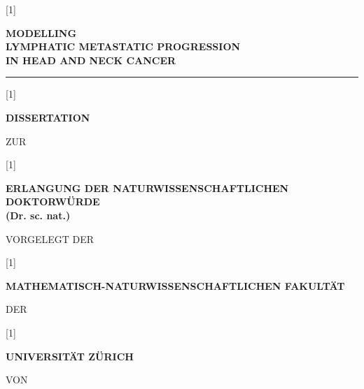 \documentclass[\relativeRoot/main.tex]{subfiles}
\begin{document}
    \begin{titlepage}
        \begin{center}
            \scalebox{0.7}[1]{\begin{minipage}{1.4\textwidth}
                \centering
                \bfseries
                \huge
                \MakeUppercase{Modelling\\Lymphatic Metastatic Progression\\in Head and Neck Cancer}
            \end{minipage}} \vspace{5mm}
            
            \rule{2cm}{0.5pt} \vspace{1cm}

            \scalebox{0.8}[1]{\begin{minipage}{\textwidth}
                \centering
                \bfseries
                \Large
                DISSERTATION
            \end{minipage}} \vfill
            
            {\footnotesize ZUR} \vfill

            \scalebox{0.7}[1]{\begin{minipage}{1.42\textwidth}
                \centering
                \bfseries
                \large
                ERLANGUNG DER NATURWISSENSCHAFTLICHEN DOKTORWÜRDE\\
                (Dr. sc. nat.)
            \end{minipage}} \vfill

            {\footnotesize VORGELEGT DER} \vfill

            \scalebox{0.7}[1]{\begin{minipage}{1.42\textwidth}
                \centering
                \bfseries
                \large
                MATHEMATISCH-NATURWISSENSCHAFTLICHEN FAKULTÄT
            \end{minipage}} \vfill

            {\footnotesize DER} \vfill

            \scalebox{0.7}[1]{\begin{minipage}{1.0\textwidth}
                \centering
                \bfseries
                \large
                UNIVERSITÄT ZÜRICH
            \end{minipage}} \vfill

            {\footnotesize VON} \vspace{3mm}


\end{center}
\end{titlepage}
\end{document}
